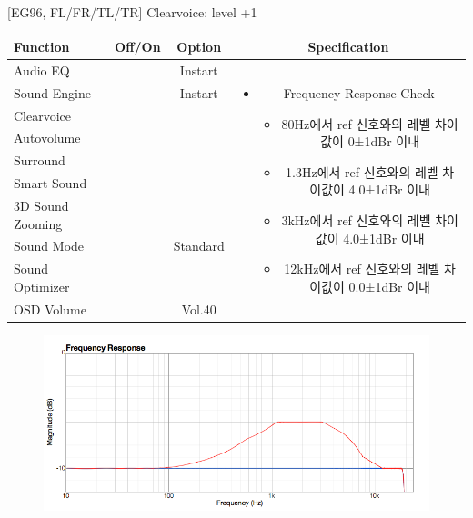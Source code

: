 \documentclass{beamer}
\begin{document}
\begin{frame}[t]{[EG96, FL/FR/TL/TR] Clearvoice: level +1}
\begin{tiny}
\begin{tabular}{@{}lccc@{}}
\toprule
Function & Off/On & Option & Specification \\
\midrule
Audio EQ & \color{black}{Off} & Instart &
\multirow{10}{60mm}{
\begin{itemize}
\item Frequency Response Check
	\begin{itemize}
	\item 80Hz에서 ref 신호와의 레벨 차이값이 0±1dBr 이내
	\item 1.3Hz에서 ref 신호와의 레벨 차이값이 4.0±1dBr 이내
	\item 3kHz에서 ref 신호와의 레벨 차이값이 4.0±1dBr 이내
	\item 12kHz에서 ref 신호와의 레벨 차이값이 0.0±1dBr 이내
	\end{itemize}
\end{itemize}
} \\
Sound Engine & \color{blue}{On} & Instart & \\
Clearvoice & \color{blue}{On} & \color{blue}{+1} & \\
Autovolume & \color{black}{Off} & & \\
Surround & \color{black}{Off} & & \\
Smart Sound & \color{black}{Off} & & \\
3D Sound Zooming & \color{black}{Off} & & \\
Sound Mode & \color{blue}{On} & Standard & \\
Sound Optimizer & \color{black}{Off} & & \\
OSD Volume & \color{blue}{On} & Vol.40 & \\
\midrule
\end{tabular}
\end{tiny}

\begin{figure}[b]
\includegraphics[height=0.4\textwidth]{figure/EG96/cv1.png}
\end{figure}

\end{frame}
\end{document}
